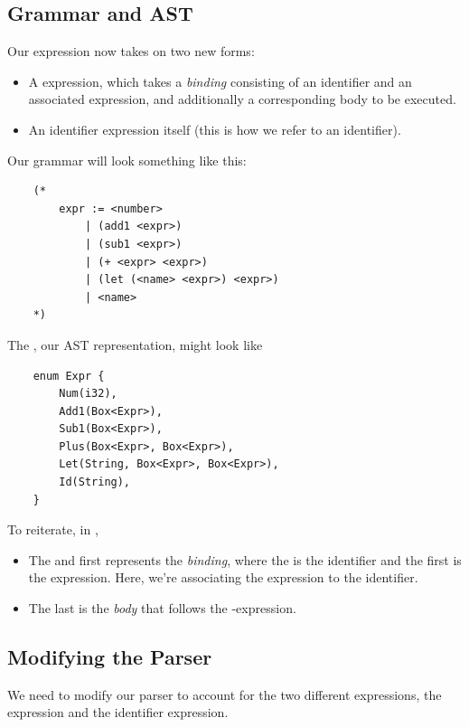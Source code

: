 \subsection{Grammar and AST}
Our expression now takes on two new forms:
\begin{itemize}
    \item A  expression, which takes a \emph{binding} consisting of an identifier and an associated expression, and additionally a corresponding body to be executed. 
    \item An identifier expression itself (this is how we refer to an identifier). 
\end{itemize}
Our grammar will look something like this: 
\begin{verbatim}
    (*
        expr := <number>
            | (add1 <expr>)
            | (sub1 <expr>)
            | (+ <expr> <expr>)
            | (let (<name> <expr>) <expr>)
            | <name>
    *)\end{verbatim}
The  , our AST representation, might look like 
\begin{verbatim}
    enum Expr {
        Num(i32),
        Add1(Box<Expr>),
        Sub1(Box<Expr>),
        Plus(Box<Expr>, Box<Expr>),
        Let(String, Box<Expr>, Box<Expr>),
        Id(String),
    }\end{verbatim} 
To reiterate, in , 
\begin{itemize}
    \item The  and first  represents the \emph{binding}, where the  is the identifier and the first  is the expression. Here, we're associating the expression to the identifier. 
    \item The last  is the \emph{body} that follows the -expression.
\end{itemize}

\subsection{Modifying the Parser}
We need to modify our parser to account for the two different expressions, the  expression and the identifier expression. 

